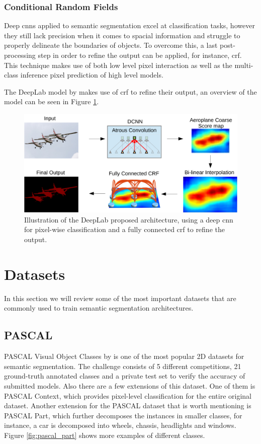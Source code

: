 \subsubsection{Conditional Random Fields}
Deep \gls{cnn}s applied to semantic segmentation excel at classification tasks, however they still lack precision when it comes to spacial information and struggle to properly delineate the boundaries of objects. To overcome this, a last post-processing step in order to refine the output can be applied, for instance, \gls{crf}. This technique makes use of both low level pixel interaction as well as the multi-class inference pixel prediction of high level models.

The DeepLab model by \cite{DBLP:journals/corr/ChenPK0Y16} makes use of \gls{crf} to refine their output, an overview of the model can be seen in Figure \ref{fig:deeplab}. 

\begin{figure}
	\centering
	\includegraphics[width=0.7\linewidth]{archivos/deeplab}
	\caption{Illustration of the DeepLab proposed architecture, using a deep \gls{cnn} for pixel-wise classification and a fully connected \gls{crf} to refine the output.}
	\label{fig:deeplab}
\end{figure}

\section{Datasets}
\label{sec:datasets}
In this section we will review some of the most important datasets that are commonly used to train semantic segmentation architectures. 

\subsection{PASCAL}
PASCAL Visual Object Classes by \cite{Everingham15} is one of the most popular 2D datasets for semantic segmentation. The challenge consists of 5 different competitions, 21 ground-truth annotated classes and a private test set to verify the accuracy of submitted models. Also there are a few extensions of this dataset. One of them is PASCAL Context, which provides pixel-level classification for the entire original dataset. Another extension for the PASCAL dataset that is worth mentioning is PASCAL Part, which further decomposes the instances in smaller classes, for instance, a car is decomposed into wheels, chassis, headlights and windows. Figure \ref{fig:pascal_part} shows more examples of different classes.

